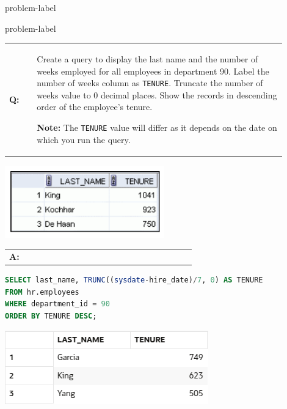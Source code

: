 \begin{problem}{}{problem-label}
\end{problem}

\begin{problem}{}{problem-label}

\begin{tabular}{@{}l p{0.9\linewidth}@{}}
  \textbf{Q:} & Create a query to display the last name and the number of weeks employed for all employees in
department 90. Label the number of weeks column as \texttt{TENURE}. Truncate the number of weeks value to 0 decimal places. Show the records in descending order of the employee’s tenure.

\textbf{Note:} The \texttt{TENURE} value will differ as it depends on the date on which you run the query.
\end{tabular}

\begin{center}
  \includegraphics[scale=0.8]{images/c3q9.png}
\end{center}

\newpage

\begin{tabular}{@{}l p{0.9\linewidth}@{}}
  \textbf{A:} & 
\end{tabular}


\begin{lstlisting}[language=SQL]
SELECT last_name, TRUNC((sysdate-hire_date)/7, 0) AS TENURE
FROM hr.employees
WHERE department_id = 90
ORDER BY TENURE DESC;
\end{lstlisting}

\vspace{1em}

\begin{center}
  \includegraphics[scale=0.8]{images/c3a9.png}
\end{center}

\end{problem}

